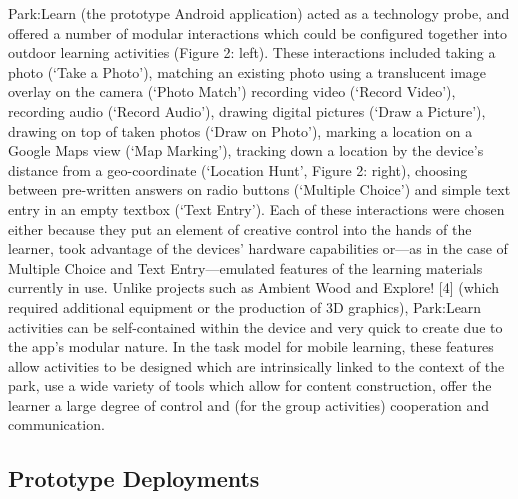 Park:Learn (the prototype Android application) acted as a technology probe, and offered a number of modular interactions which could be configured together into outdoor learning activities (Figure 2: left). These interactions included taking a photo (‘Take a Photo’), matching an existing photo using a translucent image overlay on the camera (‘Photo Match’) recording video (‘Record Video’), recording audio (‘Record Audio’), drawing digital pictures (‘Draw a Picture’), drawing on top of taken photos (‘Draw on Photo’), marking a location on a Google Maps view (‘Map Marking’), tracking down a location by the device’s distance from a geo-coordinate (‘Location Hunt’, Figure 2: right), choosing between pre-written answers on radio buttons (‘Multiple Choice’) and simple text entry in an empty textbox (‘Text Entry’). Each of these interactions were chosen either because they put an element of creative control into the hands of the learner, took advantage of the devices’ hardware capabilities or—as in the case of Multiple Choice and Text Entry—emulated features of the learning materials currently in use. Unlike projects such as Ambient Wood and Explore! [4] (which required additional equipment or the production of 3D graphics), Park:Learn activities can be self-contained within the device and very quick to create due to the app’s modular nature. In the task model for mobile learning, these features allow activities to be designed which are intrinsically linked to the context of the park, use a wide variety of tools which allow for content construction, offer the learner a large degree of control and (for the group activities) cooperation and communication. 

\subsection{Prototype Deployments}

